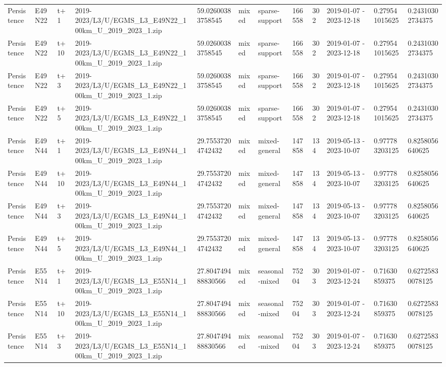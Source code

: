 \begin{landscape}
\begin{longtable}{llllllllllll}
Persistence & E49N22 & t+1 & 2019-2023/L3/U/EGMS\_L3\_E49N22\_100km\_U\_2019\_2023\_1.zip & 59.02600383758545 & mixed & sparse-support & 166558 & 302 & 2019-01-07 - 2023-12-18 & 0.279541015625 & 0.24310302734375 \\
Persistence & E49N22 & t+10 & 2019-2023/L3/U/EGMS\_L3\_E49N22\_100km\_U\_2019\_2023\_1.zip & 59.02600383758545 & mixed & sparse-support & 166558 & 302 & 2019-01-07 - 2023-12-18 & 0.279541015625 & 0.24310302734375 \\
Persistence & E49N22 & t+3 & 2019-2023/L3/U/EGMS\_L3\_E49N22\_100km\_U\_2019\_2023\_1.zip & 59.02600383758545 & mixed & sparse-support & 166558 & 302 & 2019-01-07 - 2023-12-18 & 0.279541015625 & 0.24310302734375 \\
Persistence & E49N22 & t+5 & 2019-2023/L3/U/EGMS\_L3\_E49N22\_100km\_U\_2019\_2023\_1.zip & 59.02600383758545 & mixed & sparse-support & 166558 & 302 & 2019-01-07 - 2023-12-18 & 0.279541015625 & 0.24310302734375 \\
Persistence & E49N44 & t+1 & 2019-2023/L3/U/EGMS\_L3\_E49N44\_100km\_U\_2019\_2023\_1.zip & 29.75537204742432 & mixed & mixed-general & 147858 & 134 & 2019-05-13 - 2023-10-07 & 0.977783203125 & 0.8258056640625 \\
Persistence & E49N44 & t+10 & 2019-2023/L3/U/EGMS\_L3\_E49N44\_100km\_U\_2019\_2023\_1.zip & 29.75537204742432 & mixed & mixed-general & 147858 & 134 & 2019-05-13 - 2023-10-07 & 0.977783203125 & 0.8258056640625 \\
Persistence & E49N44 & t+3 & 2019-2023/L3/U/EGMS\_L3\_E49N44\_100km\_U\_2019\_2023\_1.zip & 29.75537204742432 & mixed & mixed-general & 147858 & 134 & 2019-05-13 - 2023-10-07 & 0.977783203125 & 0.8258056640625 \\
Persistence & E49N44 & t+5 & 2019-2023/L3/U/EGMS\_L3\_E49N44\_100km\_U\_2019\_2023\_1.zip & 29.75537204742432 & mixed & mixed-general & 147858 & 134 & 2019-05-13 - 2023-10-07 & 0.977783203125 & 0.8258056640625 \\
Persistence & E55N14 & t+1 & 2019-2023/L3/U/EGMS\_L3\_E55N14\_100km\_U\_2019\_2023\_1.zip & 27.804749488830566 & mixed & seasonal-mixed & 75204 & 303 & 2019-01-07 - 2023-12-24 & 0.71630859375 & 0.62725830078125 \\
Persistence & E55N14 & t+10 & 2019-2023/L3/U/EGMS\_L3\_E55N14\_100km\_U\_2019\_2023\_1.zip & 27.804749488830566 & mixed & seasonal-mixed & 75204 & 303 & 2019-01-07 - 2023-12-24 & 0.71630859375 & 0.62725830078125 \\
Persistence & E55N14 & t+3 & 2019-2023/L3/U/EGMS\_L3\_E55N14\_100km\_U\_2019\_2023\_1.zip & 27.804749488830566 & mixed & seasonal-mixed & 75204 & 303 & 2019-01-07 - 2023-12-24 & 0.71630859375 & 0.62725830078125 \\

\end{longtable}
\end{landscape}
